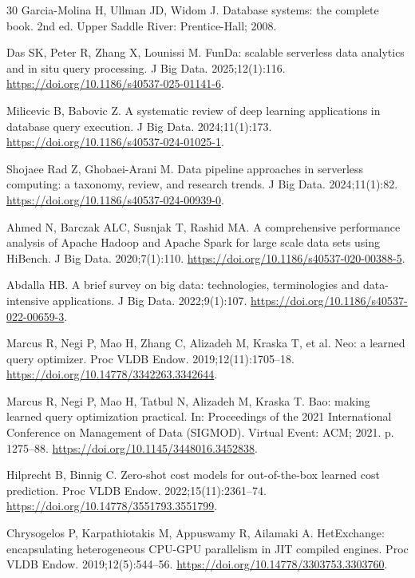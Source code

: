 \documentclass[10pt,a4paper]{article}
\begin{document}
\begin{thebibliography}{30}
Garcia-Molina H, Ullman JD, Widom J. Database systems: the complete book. 2nd ed. Upper Saddle River: Prentice-Hall; 2008.

Das SK, Peter R, Zhang X, Lounissi M. FunDa: scalable serverless data analytics and in situ query processing. J Big Data. 2025;12(1):116. \url{https://doi.org/10.1186/s40537-025-01141-6}.

Milicevic B, Babovic Z. A systematic review of deep learning applications in database query execution. J Big Data. 2024;11(1):173. \url{https://doi.org/10.1186/s40537-024-01025-1}.

Shojaee Rad Z, Ghobaei-Arani M. Data pipeline approaches in serverless computing: a taxonomy, review, and research trends. J Big Data. 2024;11(1):82. \url{https://doi.org/10.1186/s40537-024-00939-0}.

Ahmed N, Barczak ALC, Susnjak T, Rashid MA. A comprehensive performance analysis of Apache Hadoop and Apache Spark for large scale data sets using HiBench. J Big Data. 2020;7(1):110. \url{https://doi.org/10.1186/s40537-020-00388-5}.

Abdalla HB. A brief survey on big data: technologies, terminologies and data-intensive applications. J Big Data. 2022;9(1):107. \url{https://doi.org/10.1186/s40537-022-00659-3}.

Marcus R, Negi P, Mao H, Zhang C, Alizadeh M, Kraska T, et al. Neo: a learned query optimizer. Proc VLDB Endow. 2019;12(11):1705--18. \url{https://doi.org/10.14778/3342263.3342644}.

Marcus R, Negi P, Mao H, Tatbul N, Alizadeh M, Kraska T. Bao: making learned query optimization practical. In: Proceedings of the 2021 International Conference on Management of Data (SIGMOD). Virtual Event: ACM; 2021. p. 1275--88. \url{https://doi.org/10.1145/3448016.3452838}.

Hilprecht B, Binnig C. Zero-shot cost models for out-of-the-box learned cost prediction. Proc VLDB Endow. 2022;15(11):2361--74. \url{https://doi.org/10.14778/3551793.3551799}.

Chrysogelos P, Karpathiotakis M, Appuswamy R, Ailamaki A. HetExchange: encapsulating heterogeneous CPU-GPU parallelism in JIT compiled engines. Proc VLDB Endow. 2019;12(5):544--56. \url{https://doi.org/10.14778/3303753.3303760}.


\end{thebibliography}
\end{document}
